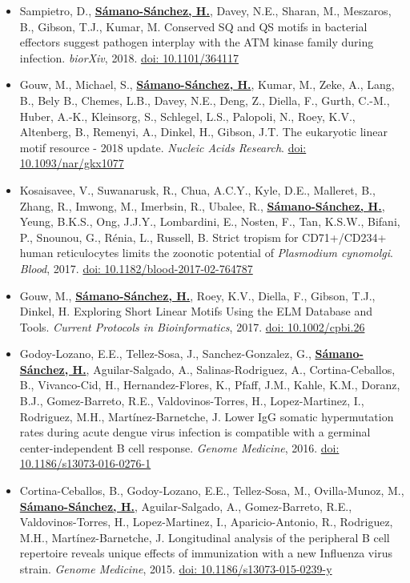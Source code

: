 \documentclass[11pt,a4paper,sans]{moderncv} %
\begin{document}
\begin{itemize}
  \item Sampietro, D., \textbf{\underline{S\'amano-S\'anchez, H.}}, Davey, N.E., Sharan, M., Meszaros, B., Gibson, T.J., Kumar, M. Conserved SQ and QS motifs in bacterial effectors suggest pathogen interplay with the ATM kinase family during infection. \textit{biorXiv}, 2018. \href{https://doi.org/10.1101/364117}{doi: 10.1101/364117}
  \item Gouw, M., Michael, S., \textbf{\underline{S\'amano-S\'anchez, H.}}, Kumar, M., Zeke, A., Lang, B., Bely B., Chemes, L.B., Davey, N.E., Deng, Z., Diella, F., Gurth, C.-M., Huber, A.-K., Kleinsorg, S., Schlegel, L.S., Palopoli, N., Roey, K.V., Altenberg, B., Remenyi, A., Dinkel, H., Gibson, J.T. The eukaryotic linear motif resource - 2018 update. \textit{Nucleic Acids Research}. \href{https://doi.org/10.1093/nar/gkx1077}{doi: 10.1093/nar/gkx1077}
  \item Kosaisavee, V., Suwanarusk, R., Chua, A.C.Y., Kyle, D.E., Malleret, B., Zhang, R., Imwong, M., Imerbsin, R., Ubalee, R., \textbf{\underline{S\'amano-S\'anchez, H.}}, Yeung, B.K.S., Ong, J.J.Y., Lombardini, E., Nosten, F., Tan, K.S.W., Bifani, P., Snounou, G., R\'enia, L., Russell, B. Strict tropism for CD71+/CD234+ human reticulocytes limits the zoonotic potential of \textit{Plasmodium cynomolgi}. \textit{Blood}, 2017. \href{https://doi.org/10.1182/blood-2017-02-764787}{doi: 10.1182/blood-2017-02-764787}
  \item Gouw, M., \textbf{\underline{S\'amano-S\'anchez, H.}}, Roey, K.V., Diella, F., Gibson, T.J., Dinkel, H. Exploring Short Linear Motifs Using the ELM Database and Tools. \textit{Current Protocols in Bioinformatics}, 2017. \href{https://doi.org/10.1002/cpbi.26}{doi: 10.1002/cpbi.26}
  \item Godoy-Lozano, E.E., Tellez-Sosa, J., Sanchez-Gonzalez, G., \textbf{\underline{S\'amano-S\'anchez, H.}}, Aguilar-Salgado, A., Salinas-Rodriguez, A., Cortina-Ceballos, B., Vivanco-Cid, H., Hernandez-Flores, K., Pfaff, J.M., Kahle, K.M., Doranz, B.J., Gomez-Barreto, R.E., Valdovinos-Torres, H., Lopez-Martinez, I., Rodriguez, M.H., Mart\'inez-Barnetche, J. Lower IgG somatic hypermutation rates during acute dengue virus infection is compatible with a germinal center-independent B cell response. \textit{Genome Medicine}, 2016. \href{https://doi.org/10.1186/s13073-016-0276-1}{doi: 10.1186/s13073-016-0276-1}
  \item Cortina-Ceballos, B., Godoy-Lozano, E.E., Tellez-Sosa, M., Ovilla-Munoz, M., \textbf{\underline{S\'amano-S\'anchez, H.}}, Aguilar-Salgado, A., Gomez-Barreto, R.E., Valdovinos-Torres, H., Lopez-Martinez, I., Aparicio-Antonio, R., Rodriguez, M.H., Mart\'inez-Barnetche, J. Longitudinal analysis of the peripheral B cell repertoire reveals unique effects of immunization with a new Influenza virus strain. \textit{Genome Medicine}, 2015. \href{https://doi.org/10.1186/s13073-015-0239-y}{doi: 10.1186/s13073-015-0239-y}

\end{itemize}
\end{document}

